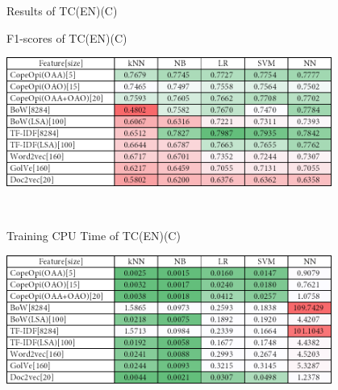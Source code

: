 \caption{Results of TC(EN)(C)}
\label{tab:tc_en_c}
\centering
\begin{subtable}{\textwidth}
	\centering
	\caption{F1-scores of TC(EN)(C)}
	\includegraphics[width=0.8\textwidth]{./figure/01B3.png}
\end{subtable}\\[1em]
\begin{subtable}{\textwidth}
	\centering
	\caption{Training CPU Time of TC(EN)(C)}
	\includegraphics[width=0.8\textwidth]{./figure/01B3t.png}
\end{subtable}
